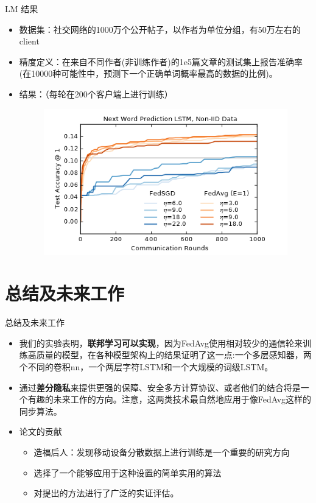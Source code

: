 \documentclass{beamer}
\begin{document}
\begin{frame}{LM {\songti 结果}}
    \begin{itemize}
        \item 数据集：社交网络的1000万个公开帖子，以作者为单位分组，有50万左右的client
        \item 精度定义：在来自不同作者(非训练作者)的1e5篇文章的测试集上报告准确率(在10000种可能性中，预测下一个正确单词概率最高的数据的比例)。
        \item 结果：（每轮在200个客户端上进行训练）
        \begin{figure}
            \centering
            \includegraphics[scale=0.46]{images/LMresult.png}
        \end{figure}
    \end{itemize}
\end{frame}

\section{总结及未来工作}
\begin{frame}{总结及未来工作}
    \begin{itemize}
        \item 我们的实验表明，\textbf{联邦学习可以实现}，因为FedAvg使用相对较少的通信轮来训练高质量的模型，在各种模型架构上的结果证明了这一点:一个多层感知器，两个不同的卷积nn，一个两层字符LSTM和一个大规模的词级LSTM。
        \item 通过\textbf{差分隐私}来提供更强的保障、安全多方计算协议、或者他们的结合将是一个有趣的未来工作的方向。注意，这两类技术最自然地应用于像FedAvg这样的同步算法。
        \item 论文的贡献
        \begin{itemize}
            \item 造福后人：发现移动设备分散数据上进行训练是一个重要的研究方向
            \item 选择了一个能够应用于这种设置的简单实用的算法
            \item 对提出的方法进行了广泛的实证评估。
        \end{itemize}
    \end{itemize}
\end{frame}




\begin{frame}
\end{frame}





\end{document}
